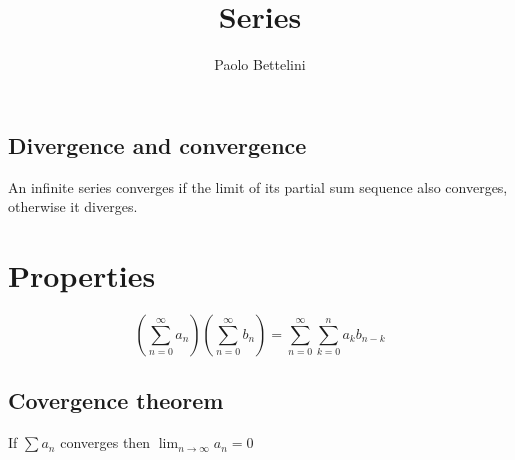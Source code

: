 \documentclass{article}
\title{Series}
\author{Paolo Bettelini}
\date{}
\begin{document}
\maketitle
\tableofcontents
\pagebreak

\subsection{Divergence and convergence}

An infinite series converges if the limit
of its partial sum sequence also converges,
otherwise it diverges.

\section{Properties}

\[
    \left(
        \sum_{n=0}^\infty a_n
    \right)
    \left(
        \sum_{n=0}^\infty b_n
    \right)
    =
    \sum_{n=0}^\infty \sum_{k=0}^n a_k b_{n-k}
\]

\subsection{Covergence theorem}

If \(\sum a_n\) converges then \(\lim_{n\to\infty}a_n=0\)

\pagebreak
\end{document}
